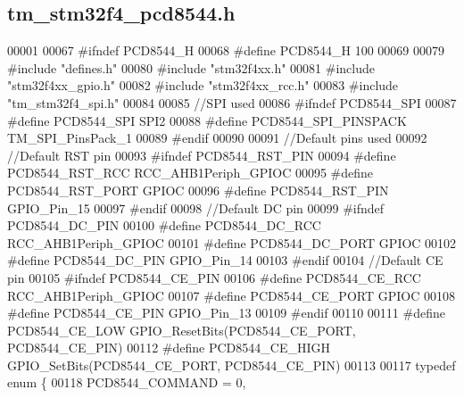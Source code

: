 \hypertarget{tm__stm32f4__pcd8544_8h_source}{}\subsection{tm\+\_\+stm32f4\+\_\+pcd8544.\+h}

\begin{DoxyCode}
00001 
00067 \textcolor{preprocessor}{#ifndef PCD8544\_H}
00068 \textcolor{preprocessor}{#define PCD8544\_H 100}
00069 
00079 \textcolor{preprocessor}{#include "defines.h"}
00080 \textcolor{preprocessor}{#include "stm32f4xx.h"}
00081 \textcolor{preprocessor}{#include "stm32f4xx\_gpio.h"}
00082 \textcolor{preprocessor}{#include "stm32f4xx\_rcc.h"}
00083 \textcolor{preprocessor}{#include "tm\_stm32f4\_spi.h"}
00084 
00085 \textcolor{comment}{//SPI used}
00086 \textcolor{preprocessor}{#ifndef PCD8544\_SPI}
00087 \textcolor{preprocessor}{#define PCD8544\_SPI             SPI2}
00088 \textcolor{preprocessor}{#define PCD8544\_SPI\_PINSPACK    TM\_SPI\_PinsPack\_1}
00089 \textcolor{preprocessor}{#endif}
00090 
00091 \textcolor{comment}{//Default pins used}
00092 \textcolor{comment}{//Default RST pin}
00093 \textcolor{preprocessor}{#ifndef PCD8544\_RST\_PIN}
00094 \textcolor{preprocessor}{#define PCD8544\_RST\_RCC         RCC\_AHB1Periph\_GPIOC}
00095 \textcolor{preprocessor}{#define PCD8544\_RST\_PORT        GPIOC}
00096 \textcolor{preprocessor}{#define PCD8544\_RST\_PIN         GPIO\_Pin\_15}
00097 \textcolor{preprocessor}{#endif}
00098 \textcolor{comment}{//Default DC pin}
00099 \textcolor{preprocessor}{#ifndef PCD8544\_DC\_PIN}
00100 \textcolor{preprocessor}{#define PCD8544\_DC\_RCC          RCC\_AHB1Periph\_GPIOC}
00101 \textcolor{preprocessor}{#define PCD8544\_DC\_PORT         GPIOC}
00102 \textcolor{preprocessor}{#define PCD8544\_DC\_PIN          GPIO\_Pin\_14}
00103 \textcolor{preprocessor}{#endif}
00104 \textcolor{comment}{//Default CE pin}
00105 \textcolor{preprocessor}{#ifndef PCD8544\_CE\_PIN}
00106 \textcolor{preprocessor}{#define PCD8544\_CE\_RCC          RCC\_AHB1Periph\_GPIOC}
00107 \textcolor{preprocessor}{#define PCD8544\_CE\_PORT         GPIOC}
00108 \textcolor{preprocessor}{#define PCD8544\_CE\_PIN          GPIO\_Pin\_13}
00109 \textcolor{preprocessor}{#endif}
00110 
00111 \textcolor{preprocessor}{#define PCD8544\_CE\_LOW          GPIO\_ResetBits(PCD8544\_CE\_PORT, PCD8544\_CE\_PIN)}
00112 \textcolor{preprocessor}{#define PCD8544\_CE\_HIGH         GPIO\_SetBits(PCD8544\_CE\_PORT, PCD8544\_CE\_PIN)}
00113 
00117 \textcolor{keyword}{typedef} \textcolor{keyword}{enum} \{
00118     PCD8544\_COMMAND = 0,

\end{DoxyCode}
